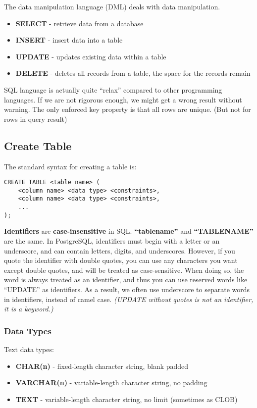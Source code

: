 \documentclass[a4paper,12pt]{article}
\begin{document}
The data manipulation language (DML) deals with data manipulation.

\begin{itemize}
	\item \textbf{SELECT} - retrieve data from a database
	\item \textbf{INSERT} - insert data into a table
	\item \textbf{UPDATE} - updates existing data within a table
	\item \textbf{DELETE} - deletes all records from a table, the space for the records remain
\end{itemize}

SQL language is actually quite ``relax'' compared to other programming languages.
If we are not rigorous enough, we might get a wrong result without warning.
The only enforced key property is that all rows are unique. (But not for rows in query result)

\subsection{Create Table}

The standard syntax for creating a table is:
\begin{verbatim}
CREATE TABLE <table name> (
	<column name> <data type> <constraints>,
	<column name> <data type> <constraints>,
	...
);
\end{verbatim}

\textbf{Identifiers} are \textbf{case-insensitive} in SQL.
\textbf{``tablename''} and \textbf{``TABLENAME''} are the same.
In PostgreSQL, identifiers must begin with a letter or an underscore, and can contain letters, digits, and underscores.
However, if you quote the identifier with double quotes, you can use any characters you want except double quotes, and will be treated as case-sensitive.
When doing so, the word is always treated as an identifier, and thus you can use reserved words like ``UPDATE'' as identifiers.
As a result, we often use underscore to separate words in identifiers, instead of camel case.
\textit{(UPDATE without quotes is not an identifier, it is a keyword.)}

\subsubsection{Data Types}

Text data types:
\begin{itemize}
	\item \textbf{CHAR(n)} - fixed-length character string, blank padded
	\item \textbf{VARCHAR(n)} - variable-length character string, no padding
	\item \textbf{TEXT} - variable-length character string, no limit (sometimes as CLOB)
\end{itemize}
\end{document}
